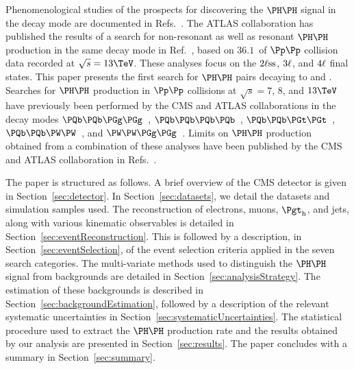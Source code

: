 Phenomenological studies of the prospects for discovering the $\HH$ signal in the \WWWW decay mode
are documented in Refs.~\cite{Baur:2002rb,Baur:2002qd,Li:2015yia,Adhikary:2017jtu,Ren:2017jbg}.
The ATLAS collaboration has published the results of a search for non-resonant as well as resonant $\HH$ production in the same decay mode in Ref.~\cite{Aaboud:2018ksn},
based on $36.1$~\fbinv of $\Pp\Pp$ collision data recorded at $\sqrt{s} = 13\TeV$.
These analyses focus on the $2\ell\text{ss}$, $3\ell$, and $4\ell$ final states.
This paper presents the first search for $\HH$ pairs decaying to \WWtt and \tttt.
Searches for $\HH$ production in $\Pp\Pp$ collisions at $\sqrt{s} = 7$, $8$, and $13\TeV$
have previously been performed by the CMS and ATLAS collaborations in the decay modes 
$\Pbottom\Pbottom\PGg\PGg$~\cite{Aad:2014yja,Khachatryan:2016sey,Sirunyan:2018iwt,Aaboud:2018ftw}, 
$\Pbottom\Pbottom\Pbottom\Pbottom$~\cite{Khachatryan:2015yea,Aad:2015uka,Aaboud:2018knk,Sirunyan:2018zkk,Sirunyan:2018tki}, 
$\Pbottom\Pbottom\PGt\PGt$~\cite{Aad:2015xja,Sirunyan:2017tqo,Sirunyan:2017djm,Aaboud:2018sfw}, 
$\Pbottom\Pbottom\PW\PW$~\cite{Sirunyan:2017guj}, 
and $\PW\PW\PGg\PGg$~\cite{Aaboud:2018ewm}.
Limits on $\HH$ production obtained from a combination of these analyses have been published by the CMS and ATLAS collaboration 
in Refs.~\cite{Aad:2015xja,Sirunyan:2017tqo,Sirunyan:2018ayu}.

The paper is structured as follows.
A brief overview of the CMS detector is given in Section~\ref{sec:detector}.
In Section~\ref{sec:datasets}, we detail the datasets and simulation samples used.
The reconstruction of electrons, muons, $\tauh$, and jets,
along with various kinematic observables is detailed in Section~\ref{sec:eventReconstruction}.
This is followed by a description, in Section~\ref{sec:eventSelection}, of the event selection criteria applied in the seven search categories.
The multi-variate methods used to distinguish the $\HH$ signal from backgrounds are detailed in Section~\ref{sec:analysisStrategy}.
The estimation of these backgrounds is described in Section~\ref{sec:backgroundEstimation},
followed by a description of the relevant systematic uncertainties in Section~\ref{sec:systematicUncertainties}.
The statistical procedure used to extract the $\HH$ production rate and the results obtained by our analysis are presented in Section~\ref{sec:results}.
The paper concludes with a summary in Section~\ref{sec:summary}.

